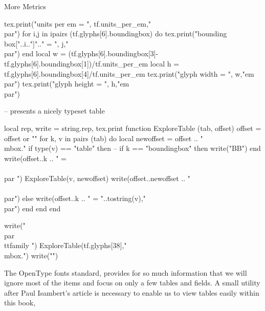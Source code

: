 \begin{texexample}{More Metrics}{}
  \begin{luacode*}
   tex.print("units per em = ", tf.units_per_em,"\\par")
   for i,j in ipairs (tf.glyphs[6].boundingbox) do
      tex.print("bounding box["..i.."]".." = ", j,"\\par")
   end 
   local w = (tf.glyphs[6].boundingbox[3]-tf.glyphs[6].boundingbox[1])/tf.units_per_em
   local h = tf.glyphs[6].boundingbox[4]/tf.units_per_em
   tex.print("glyph width = ", w,"em\\par")
   tex.print("glyph height = ", h,"em\\par")

-- presents a nicely typeset table 

local rep, write = string.rep, tex.print
function ExploreTable (tab, offset)
    offset = offset or ""
    for k, v in pairs (tab) do
        local newoffset = offset .. "\\mbox{.}"
        if type(v) == "table" then
           -- if k == "boundingbox" then write("BB") end
           write(offset..k .. " = \\{\\par ")
           ExploreTable(v, newoffset)
           write(offset..newoffset .. "\\}\\par")
         else
           write(offset..k .. " = "..tostring(v),"\\par")
         end
      end
end

write("\\par{\\ttfamily ")
ExploreTable(tf.glyphs[38],"\\mbox{.}")
write("}")
  \end{luacode*}
\end{texexample}

The OpenType fonts standard, provides for so much information that we will ignore most of the items and focus on only a few tables and fields. A small utility after Paul Isambert's article is necessary to enable us to view tables easily within this book,


